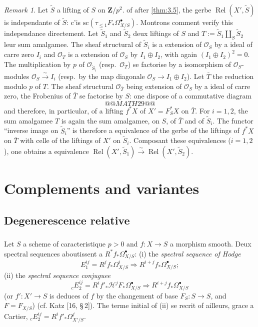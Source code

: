 \documentclass[12pt,a4paper]{article}
\theoremstyle{plain}
\theoremstyle{definition}
\theoremstyle{remark}
\newtheorem{remark}[theorem]{Remark}
\DeclareMathOperator{\Rel}{Rel}
\newcommand{\cO}{\mathcal{O}}
\begin{document}
\begin{remark}\label{rem:3.9}
Let $\tilde{S}$ a lifting of $S$ on $\mathbf{Z}/p^2$. of after \ref{thm:3.5}, the gerbe $\Rel(X', \tilde{S})$ is independante of $\tilde{S}$: c'is $\mathrm{sc}(\tau_{\le 1} F_* \Omega^{\bullet}_{X/S})$. Montrons comment verify this independance directement. Let $\tilde{S}_1$ and $\tilde{S}_2$ deux liftings of $S$ and $T := \tilde{S}_1 \amalg_S \tilde{S}_2$ leur sum amalgamee. The sheaf structural of $\tilde{S}_i$ is a extension of $\cO_S$ by a ideal of carre zero $I_i$ and $\cO_T$ is a extension of $\cO_S$ by $I_1 \oplus I_2$, with again $(I_1 \oplus I_2)^2 = 0$. The multiplication by $p$ of $\cO_{\tilde{S}_i}$ (resp.~$\cO_T$) se factorise by a isomorphism of $\cO_S$-modules $\cO_S \xrightarrow{\sim} I_i$ (resp.~by the map diagonale $\cO_S \to I_1 \oplus I_2$). Let $\bar{T}$ the reduction modulo $p$ of $T$. The sheaf structural $\cO_{\bar{T}}$ being extension of $\cO_S$ by a ideal of carre zero, the Frobenius of $\bar{T}$ se factorise by $S$: one dispose of a commutative diagram
\[
@@MATH29@@
\]
and therefore, in particular, of a lifting $f^* X$ of $X' = F_S^* X$ on $\bar{T}$. For $i = 1, 2$, the sum amalgamee $T$ is again the sum amalgamee, on $S$, of $\bar{T}$ and of $\tilde{S}_i$. The functor ``inverse image on $\tilde{S}_i$'' is therefore a equivalence of the gerbe of the liftings of $f^* X$ on $\bar{T}$ with celle of the liftings of $X'$ on $\tilde{S}_i$. Composant these equivalences ($i = 1, 2$), one obtains a equivalence $\Rel(X', \tilde{S}_1) \xrightarrow{\sim} \Rel(X', \tilde{S}_2)$.
\end{remark}

\section{Complements and variantes}

\subsection{Degenerescence relative}

\subsubsection{}

Let $S$ a scheme of caracteristique $p > 0$ and $f: X \to S$ a morphism smooth. Deux spectral sequences aboutissent a $R^* f_* \Omega^{\bullet}_{X/S}$: (i) the \emph{spectral sequence of Hodge}
\[
E_1^{ij} = R^j f_* \Omega^i_{X/S} \Rightarrow R^{i+j} f_* \Omega^{\bullet}_{X/S};
\]
(ii) the \emph{spectral sequence conjuguee}
\[
{}_c E_2^{ij} = R^i f'_* \mathscr{H}^j F_* \Omega^{\bullet}_{X/S} \Rightarrow R^{i+j} f_* \Omega^{\bullet}_{X/S}
\]
(or $f': X' \to S$ is deduces of $f$ by the changement of base $F_S: S \to S$, and $F = F_{X/S}$) (cf. Katz [16, \S\,2]). The terme initial of (ii) se recrit of ailleurs, grace a Cartier, ${}_c E_2^{ij} = R^i f'_* \Omega^j_{X'/S}$.
\end{document}
